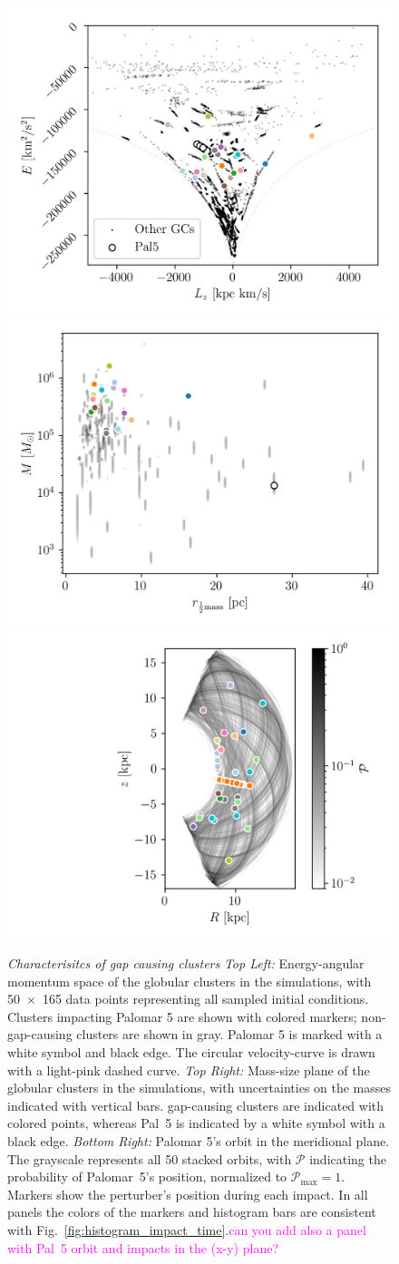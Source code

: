\documentclass[draft]{aa}
\newcommand{\paola}[1]{\textcolor{magenta}{{#1}}}
\begin{document}
    \begin{figure}
      \centering
      \includegraphics[width=0.45\linewidth]{E_Lz_perturbers.png}
      \includegraphics[width=0.45\linewidth]{mass_size_plane.png}
      \includegraphics[width=0.45\linewidth]{impact_stats_phase_space.png}
      \caption{\textit{Characterisitcs of gap causing clusters} \textit{Top Left:} Energy-angular momentum space of the globular clusters in the simulations, with 50~$\times$~165 data points representing all sampled initial conditions. Clusters impacting Palomar 5 are shown with colored markers; non-gap-causing clusters are shown in gray. Palomar 5 is marked with a white symbol and black edge. The circular velocity-curve is drawn with a light-pink dashed curve. \textit{Top Right:} Mass-size plane of the globular clusters in the simulations, with uncertainties on the masses indicated with vertical bars. gap-causing clusters are indicated with colored points, whereas Pal~5 is indicated by a white symbol with a black edge. \textit{Bottom Right:} Palomar 5's orbit in the meridional plane. The grayscale represents all 50 stacked orbits, with $\mathcal{P}$ indicating the probability of  Palomar~5's position, normalized to $\mathcal{P}_\textrm{max}=1$. Markers show the perturber's position during each impact. In all panels the colors of the markers and histogram bars are consistent with Fig.~\ref{fig:histogram_impact_time}.\paola{can you add also a panel with Pal~5 orbit and impacts in the (x-y) plane?}}
      \label{fig:mass_size_plane}
    \end{figure}
\end{document}
